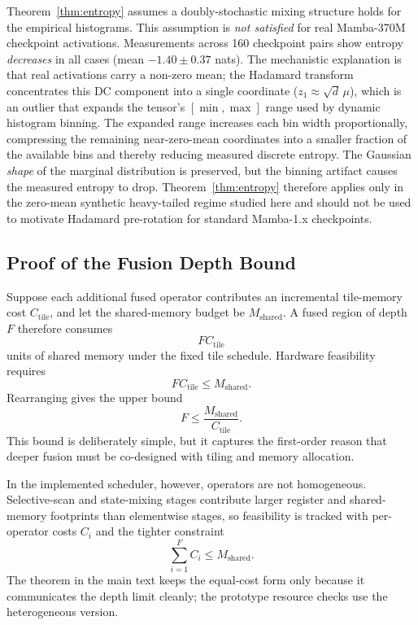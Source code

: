 \begin{remark}
\label{rem:applicability}
Theorem~\ref{thm:entropy} assumes a doubly-stochastic mixing structure holds for the empirical histograms. This assumption is \emph{not satisfied} for real Mamba-370M checkpoint activations. Measurements across 160 checkpoint pairs show entropy \emph{decreases} in all cases (mean $-1.40\pm0.37$ nats). The mechanistic explanation is that real activations carry a non-zero mean; the Hadamard transform concentrates this DC component into a single coordinate ($z_1\approx\sqrt{d}\,\mu$), which is an outlier that expands the tensor's $[\min,\max]$ range used by dynamic histogram binning. The expanded range increases each bin width proportionally, compressing the remaining near-zero-mean coordinates into a smaller fraction of the available bins and thereby reducing measured discrete entropy. The Gaussian \emph{shape} of the marginal distribution is preserved, but the binning artifact causes the measured entropy to drop. Theorem~\ref{thm:entropy} therefore applies only in the zero-mean synthetic heavy-tailed regime studied here and should not be used to motivate Hadamard pre-rotation for standard Mamba-1.x checkpoints.
\end{remark}

\subsection{Proof of the Fusion Depth Bound}
Suppose each additional fused operator contributes an incremental tile-memory cost \(C_{\mathrm{tile}}\), and let the shared-memory budget be \(M_{\mathrm{shared}}\). A fused region of depth \(F\) therefore consumes
\[
F C_{\mathrm{tile}}
\]
units of shared memory under the fixed tile schedule. Hardware feasibility requires
\[
F C_{\mathrm{tile}} \le M_{\mathrm{shared}}.
\]
Rearranging gives the upper bound
\[
F \le \frac{M_{\mathrm{shared}}}{C_{\mathrm{tile}}}.
\]
This bound is deliberately simple, but it captures the first-order reason that deeper fusion must be co-designed with tiling and memory allocation.

In the implemented scheduler, however, operators are not homogeneous. Selective-scan and state-mixing stages contribute larger register and shared-memory footprints than elementwise stages, so feasibility is tracked with per-operator costs \(C_i\) and the tighter constraint
\[
\sum_{i=1}^{F} C_i \le M_{\mathrm{shared}}.
\]
The theorem in the main text keeps the equal-cost form only because it communicates the depth limit cleanly; the prototype resource checks use the heterogeneous version.

